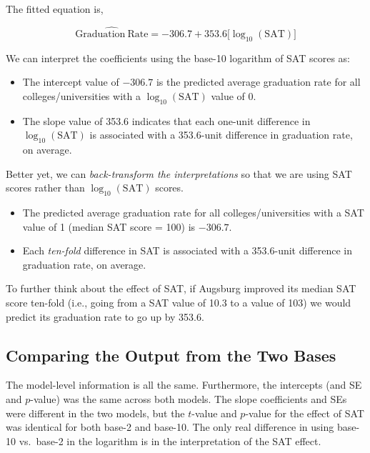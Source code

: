 \documentclass[]{book}
\providecommand{\tightlist}{%
  \setlength{\itemsep}{0pt}\setlength{\parskip}{0pt}}
\begin{document}
The fitted equation is,

\[
\hat{\mathrm{Graduation~Rate}} = -306.7 + 353.6\bigg[\log_{10}(\mathrm{SAT})\bigg]
\]

We can interpret the coefficients using the base-10 logarithm of SAT scores as:

\begin{itemize}
\tightlist
\item
  The intercept value of \(-306.7\) is the predicted average graduation rate for all colleges/universities with a \(\log_{10}(\mathrm{SAT})\) value of 0.
\item
  The slope value of 353.6 indicates that each one-unit difference in \(\log_{10}(\mathrm{SAT})\) is associated with a 353.6-unit difference in graduation rate, on average.
\end{itemize}

Better yet, we can \emph{back-transform the interpretations} so that we are using SAT scores rather than \(\log_{10}(\mathrm{SAT})\) scores.

\begin{itemize}
\tightlist
\item
  The predicted average graduation rate for all colleges/universities with a SAT value of 1 (median SAT score = 100) is \(-306.7\).
\item
  Each \emph{ten-fold} difference in SAT is associated with a 353.6-unit difference in graduation rate, on average.
\end{itemize}

To further think about the effect of SAT, if Augsburg improved its median SAT score ten-fold (i.e., going from a SAT value of 10.3 to a value of 103) we would predict its graduation rate to go up by 353.6.

\hypertarget{comparing-the-output-from-the-two-bases}{%
\subsection{Comparing the Output from the Two Bases}\label{comparing-the-output-from-the-two-bases}}

The model-level information is all the same. Furthermore, the intercepts (and SE and \(p\)-value) was the same across both models. The slope coefficients and SEs were different in the two models, but the \(t\)-value and \(p\)-value for the effect of SAT was identical for both base-2 and base-10. The only real difference in using base-10 vs.~base-2 in the logarithm is in the interpretation of the SAT effect.
\end{document}
